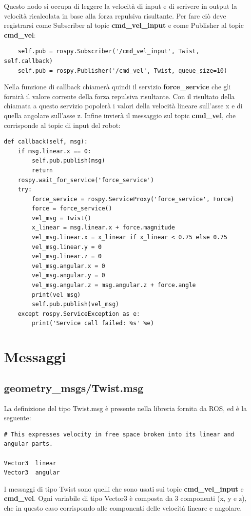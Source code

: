 \documentclass[Lau, binding=0.6cm, oneside]{sapthesis}
\begin{document}
Questo nodo si occupa di leggere la velocità di input e di scrivere in output la velocità ricalcolata in base alla forza repulsiva risultante.
Per fare ciò deve registrarsi come Subscriber al topic \textbf{cmd\_vel\_input} e come Publisher al topic \textbf{cmd\_vel}:

\begin{lstlisting}
    self.pub = rospy.Subscriber('/cmd_vel_input', Twist, self.callback)
    self.pub = rospy.Publisher('/cmd_vel', Twist, queue_size=10)
\end{lstlisting}

Nella funzione di callback chiamerà quindi il servizio \textbf{force\_service} che gli fornirà il valore corrente della forza repulsiva risultante.
Con il risultato della chiamata a questo servizio popolerà i valori della velocità lineare sull'asse x e di quella angolare sull'asse z.
Infine invierà il messaggio sul topic \textbf{cmd\_vel}, che corrisponde al topic di input del robot:

\begin{lstlisting}
def callback(self, msg):
    if msg.linear.x == 0:
        self.pub.publish(msg)
        return
    rospy.wait_for_service('force_service')
    try:
        force_service = rospy.ServiceProxy('force_service', Force)
        force = force_service()
        vel_msg = Twist()
        x_linear = msg.linear.x + force.magnitude
        vel_msg.linear.x = x_linear if x_linear < 0.75 else 0.75
        vel_msg.linear.y = 0
        vel_msg.linear.z = 0
        vel_msg.angular.x = 0
        vel_msg.angular.y = 0
        vel_msg.angular.z = msg.angular.z + force.angle
        print(vel_msg)
        self.pub.publish(vel_msg)
    except rospy.ServiceException as e:
        print('Service call failed: %s' %e)
\end{lstlisting}

\section{Messaggi}
\subsection{geometry\_msgs/Twist.msg}
La definizione del tipo Twist.msg è presente nella libreria fornita da ROS, ed è la seguente\cite{fonte5}:
\begin{lstlisting}
# This expresses velocity in free space broken into its linear and angular parts.

Vector3  linear
Vector3  angular
\end{lstlisting}
I messaggi di tipo Twist sono quelli che sono usati sui topic \textbf{cmd\_vel\_input} e \textbf{cmd\_vel}.
Ogni variabile di tipo Vector3 è composta da 3 componenti (x, y e z), che in questo caso corrispondo alle componenti delle velocità lineare e angolare.
\end{document}
